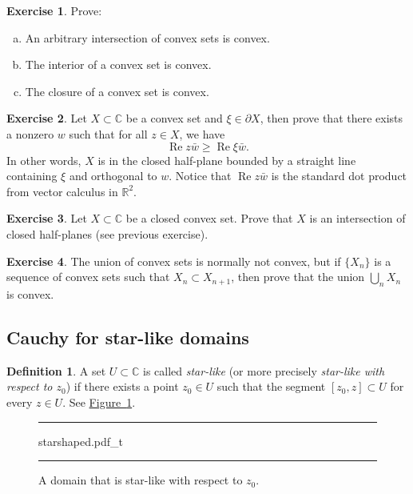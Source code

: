 \documentclass[12pt,openany]{book}
\renewcommand{\Re}{\operatorname{Re}}
\newcommand{\C}{{\mathbb{C}}}
\newcommand{\R}{{\mathbb{R}}}
\newcommand{\myindex}[1]{#1\index{#1}}
\theoremstyle{plain}
\theoremstyle{remark}
\theoremstyle{definition}
\newtheorem{defn}[thm]{Definition}
\newenvironment{exbox}{%
    \def\FrameCommand{\vrule width 1pt \relax\hspace{10pt}}%
    \MakeFramed{\advance\hsize-\width\FrameRestore}%
}{%
    \endMakeFramed
}
\newenvironment{exparts}{%
    \leavevmode\begin{enumerate}[a),noitemsep,topsep=0pt,parsep=0pt,partopsep=0pt]
}{%
    \end{enumerate}
}
\newenvironment{myfig}{%
\begin{figure}[h!t]
\noindent\rule{\textwidth}{0.5pt}\vspace{12pt}\par\centering}%
{\par\noindent\rule{\textwidth}{0.5pt}
\end{figure}}
\theoremstyle{exercise}
\newtheorem{exercise}{Exercise}[section]
\theoremstyle{example}
\newcommand{\figureref}[1]{\hyperref[#1]{Figure~\ref*{#1}}}
\begin{document}
\begin{exbox}
\begin{exercise}
Prove:
\begin{exparts}
\item
An arbitrary intersection of convex sets is convex.
\item
The interior of a convex set is convex.
\item
The closure of a convex set is convex.
\end{exparts}
\end{exercise}

\begin{exercise}
Let $X \subset \C$ be a convex set and $\xi \in \partial X$, then prove that
there exists a nonzero $w$ such that for all $z \in X$, we have
\begin{equation*}
\Re z\bar{w} \geq \Re \xi\bar{w} .
\end{equation*}
In other words, $X$ is in the closed half-plane
bounded by a straight line containing $\xi$ and
orthogonal to $w$.
Notice that $\Re z\bar{w}$ is the standard dot product from
vector calculus in $\R^2$.
\end{exercise}

\begin{exercise}
Let $X \subset \C$ be a closed convex set.
Prove that $X$ is an intersection of closed half-planes (see previous
exercise).
\end{exercise}

\begin{exercise}
The union of convex sets is normally not convex, but if $\{ X_n \}$ is a
sequence of convex sets such that $X_n \subset X_{n+1}$, then
prove that the union $\bigcup_n X_n$ is convex.
\end{exercise}
\end{exbox}

\subsection{Cauchy for star-like domains}

\begin{defn}
A set $U \subset \C$ is called \emph{\myindex{star-like}} (or more precisely
\emph{star-like with respect to $z_0$}) if there exists a
point $z_0 \in U$ such that the segment $[z_0,z] \subset U$ for every
$z \in U$.  See \figureref{fig:starshaped}.
\end{defn}

\begin{myfig}
{starshaped.pdf_t}
\caption{A domain that is star-like with respect to $z_0$.\label{fig:starshaped}}
\end{myfig}
\end{document}
